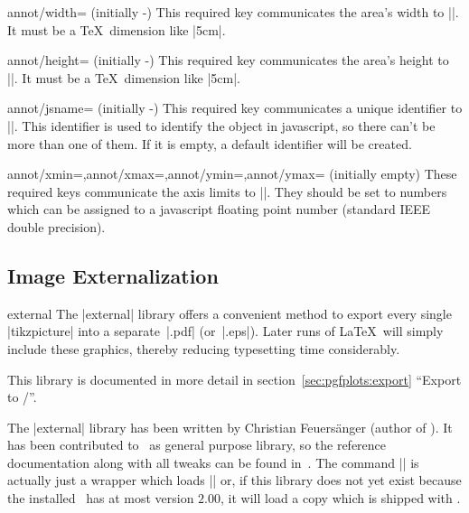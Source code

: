 \begin{pgfplotskey}{annot/width= (initially -)}
	This required key communicates the area's width to |\pgfplotsclickablecreate|. It must be a \TeX\ dimension like |5cm|.
\end{pgfplotskey}
\begin{pgfplotskey}{annot/height= (initially -)}
	This required key communicates the area's height to |\pgfplotsclickablecreate|. It must be a \TeX\ dimension like |5cm|.
\end{pgfplotskey}
\begin{pgfplotskey}{annot/jsname= (initially -)}
	This required key communicates a unique identifier to |\pgfplotsclickablecreate|. This identifier is used to identify the object in javascript, so there can't be more than one of them. If it is empty, a default identifier will be created.
\end{pgfplotskey}

\begin{pgfplotskeylist}{annot/xmin=,annot/xmax=,annot/ymin=,annot/ymax= (initially empty)}
	These required keys communicate the axis limits to |\pgfplotsclickablecreate|. They should be set to numbers which can be assigned to a javascript floating point number (standard IEEE double precision).
\end{pgfplotskeylist}




\subsection{Image Externalization}
\begin{pgfplotslibrary}{external}
	The |external| library offers a convenient method to export every single |tikzpicture| into a separate~|.pdf| (or~|.eps|). Later runs of \LaTeX\ will simply include these graphics, thereby reducing typesetting time considerably.
	
	This library is documented in more detail in section~\ref{sec:pgfplots:export} ``Export to {\pdf/\eps}''.


	The |external| library has been written by Christian Feuers\"anger (author of \PGFPlots). It has been contributed to \Tikz\ as general purpose library, so the reference documentation along with all tweaks can be found in~\cite[Section ``Externalization Library'']{tikz}. The command || is actually just a wrapper which loads |\usetikzlibrary{external}| or, if this library does not yet exist because the installed \pgfname\ has at most version $2.00$, it will load a copy which is shipped with \PGFPlots.
\end{pgfplotslibrary}

